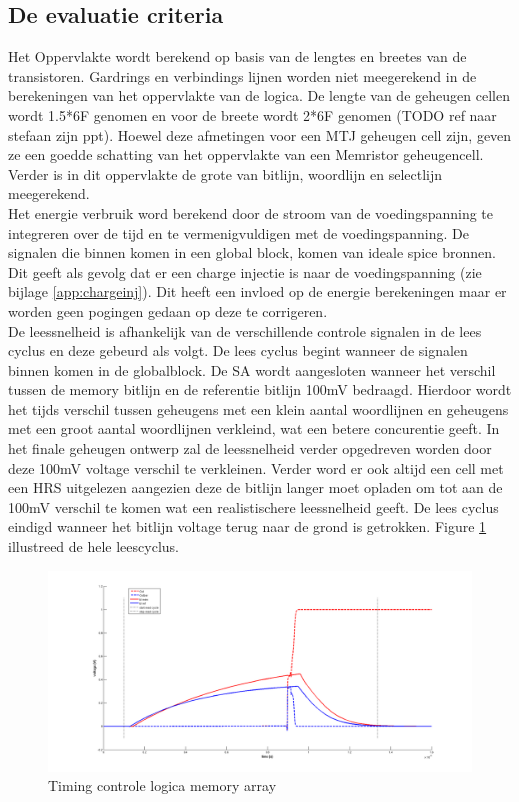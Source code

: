 \subsection{De evaluatie criteria}
Het Oppervlakte wordt berekend op basis van de lengtes en breetes van de transistoren. Gardrings en verbindings lijnen worden niet meegerekend in de berekeningen van het oppervlakte van de logica. De lengte van de geheugen cellen wordt 1.5*6F genomen en voor de breete wordt 2*6F genomen (TODO ref naar stefaan zijn ppt). Hoewel deze afmetingen voor een MTJ geheugen cell zijn, geven ze een goedde schatting van het oppervlakte van een Memristor geheugencell. Verder is in dit oppervlakte de grote van bitlijn, woordlijn en selectlijn meegerekend. \\
Het energie verbruik word berekend door de stroom van de voedingspanning te integreren over de tijd en te vermenigvuldigen met de voedingspanning. De signalen die binnen komen in een global block, komen van ideale spice bronnen. Dit geeft als gevolg dat er een charge injectie is naar de voedingspanning (zie bijlage \ref{app:chargeinj}). Dit heeft een invloed op de energie berekeningen maar er worden geen pogingen gedaan op deze te corrigeren.\\
De leessnelheid is afhankelijk van de verschillende controle signalen in de lees cyclus en deze gebeurd als volgt. De lees cyclus begint wanneer de signalen binnen komen in de globalblock. De SA wordt aangesloten wanneer het verschil tussen de memory bitlijn en de referentie bitlijn 100mV bedraagd. Hierdoor wordt het tijds verschil tussen geheugens met een klein aantal woordlijnen en geheugens met een groot aantal woordlijnen verkleind, wat een betere concurentie geeft. In het finale geheugen ontwerp zal de leessnelheid verder opgedreven worden door deze 100mV voltage verschil te verkleinen. Verder word er ook altijd een cell met een HRS uitgelezen aangezien deze de bitlijn langer moet opladen om tot aan de 100mV verschil te komen wat een realistischere leessnelheid geeft. De lees cyclus eindigd wanneer het bitlijn voltage terug naar de grond is getrokken. Figure \ref{fig:leescyclus} illustreed de hele leescyclus.

\begin{figure}[!ht]
  \centering
  \includegraphics[scale=0.6]{../fig/hfdstk-timing-leescyclus.png}
  \caption{Timing controle logica memory array}
  \label{fig:leescyclus}
\end{figure} 

